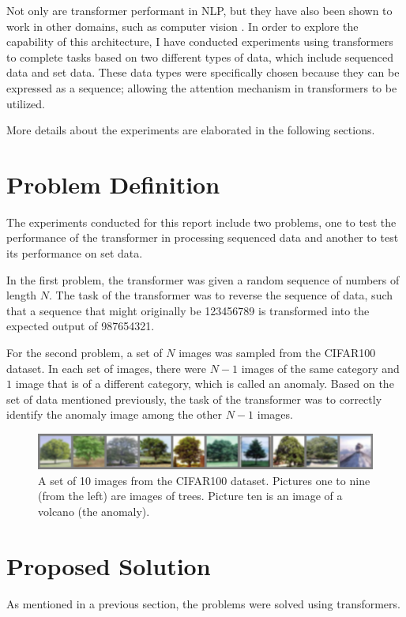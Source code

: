 \documentclass[peerreview]{IEEEtran}
\begin{document}
Not only are transformer performant in NLP, but they have also been shown to work in other domains, such as computer vision \cite{dosovitskiy_2021}. In order to explore the capability of this architecture, I have conducted experiments using transformers to complete tasks based on two different types of data, which include sequenced data and set data. These data types were specifically chosen because they can be expressed as a sequence; allowing the attention mechanism in transformers to be utilized.

More details about the experiments are elaborated in the following sections.


\section{Problem Definition}
The experiments conducted for this report include two problems, one to test the performance of the transformer in processing sequenced data and another to test its performance on set data.

In the first problem, the transformer was given a random sequence of numbers of length $N$. The task of the transformer was to reverse the sequence of data, such that a sequence that might originally be 123456789 is transformed into the expected output of 987654321.

For the second problem, a set of $N$ images was sampled from the CIFAR100 dataset. In each set of images, there were $N-1$ images of the same category and $1$ image that is of a different category, which is called an anomaly. Based on the set of data mentioned previously, the task of the transformer was to correctly identify the anomaly image among the other $N-1$ images.

\begin{figure}[!h]
\centering
\includegraphics[width=0.8\columnwidth]{imageset} 
\caption{A set of 10 images from the CIFAR100 dataset. Pictures one to nine (from the left) are images of trees. Picture ten is an image of a volcano (the anomaly).}
\label{fig_image_set}
\end{figure}


\section{Proposed Solution}
As mentioned in a previous section, the problems were solved using transformers. 
\end{document}
